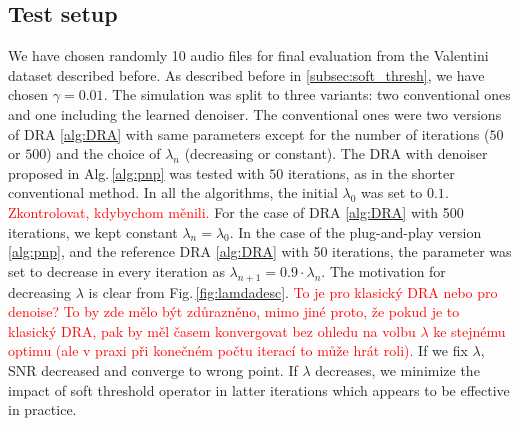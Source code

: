 \documentclass[conference]{IEEEtran}
\newcommand{\todo}[1]{\textcolor{red}{#1}}
\begin{document}
\subsection{Test setup}
We have chosen randomly 10 audio files for final evaluation from the Valentini dataset \cite{ValentiniBotinhao2017} described before.
As described before in \ref{subsec:soft_thresh}, we have chosen $\gamma = 0.01$.
The simulation was split to three variants: two conventional ones and one including the learned denoiser.
The conventional ones were two versions of DRA \ref{alg:DRA} with same parameters except for the number of iterations ($50$ or $500$) and the choice of $\lambda_n$ (decreasing or constant).
The DRA with denoiser proposed in Alg.\,\ref{alg:pnp} was tested with $50$ iterations,
as in the shorter conventional method.
In all the algorithms, the initial $\lambda_0$ was set to $0.1$. \todo{Zkontrolovat, kdybychom měnili.}
For the case of DRA \ref{alg:DRA} with 500 iterations, we kept constant $\lambda_n = \lambda_0$.
In the case of the plug-and-play version \ref{alg:pnp}, and the reference DRA \ref{alg:DRA} with 50 iterations, the parameter was set to decrease in every iteration as $\lambda_{n+1} = 0.9\cdot\lambda_n$.
The motivation for decreasing $\lambda$ is clear from Fig.\,\ref{fig:lamdadesc}.
\todo{To je pro klasický DRA nebo pro denoise? To by zde mělo být zdůrazněno, mimo jiné proto, že pokud je to klasický DRA, pak by měl časem konvergovat bez ohledu na volbu $\lambda$ ke stejnému optimu (ale v praxi při konečném počtu iterací to může hrát roli).}
If we fix $\lambda$, SNR decreased and converge to wrong point.
If $\lambda$ decreases, we minimize the impact of soft threshold operator in latter iterations which appears to be effective in practice.
\end{document}
